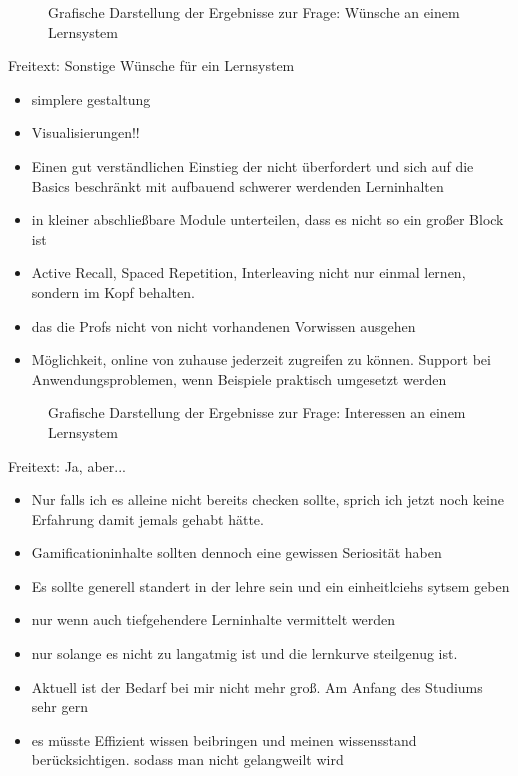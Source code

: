 \documentclass[
	ngerman,
	BCOR=8mm,
	headings=normal,
	parskip=half,
	headsepline,
	automark,
	listof=totoc,
	bibliography=totoc,
]{scrreprt}
\begin{document}
\begin{figure}[h!]
    \centering
    
    \caption{Grafische Darstellung der Ergebnisse zur Frage: Wünsche an einem Lernsystem}
\end{figure}

Freitext: Sonstige Wünsche für ein Lernsystem
\begin{itemize}
    \setlength{\itemsep}{-1pt} 
    \item simplere gestaltung
    \item Visualisierungen!!
    \item Einen gut verständlichen Einstieg der nicht überfordert und sich auf die Basics beschränkt mit aufbauend schwerer werdenden Lerninhalten
    \item in kleiner abschließbare Module unterteilen, dass es nicht so ein großer Block ist
    \item Active Recall, Spaced Repetition, Interleaving nicht nur einmal lernen, sondern im Kopf behalten.
    \item das die Profs nicht von nicht vorhandenen Vorwissen ausgehen
    \item Möglichkeit, online von zuhause jederzeit zugreifen zu können. Support bei Anwendungsproblemen, wenn Beispiele praktisch umgesetzt werden
\end{itemize}

\begin{figure}[h!]
    \centering
    
    \caption{Grafische Darstellung der Ergebnisse zur Frage: Interessen an einem Lernsystem}
\end{figure}

Freitext: Ja, aber...
\begin{itemize}
    \setlength{\itemsep}{-1pt} 
    \item Nur falls ich es alleine nicht bereits checken sollte, sprich ich jetzt noch keine Erfahrung damit jemals gehabt hätte.
    \item Gamificationinhalte sollten dennoch eine gewissen Seriosität haben
    \item Es sollte generell standert in der lehre sein und ein einheitlciehs sytsem geben
    \item nur wenn auch tiefgehendere Lerninhalte vermittelt werden
    \item nur solange es nicht zu langatmig ist und die lernkurve steilgenug ist.
    \item Aktuell ist der Bedarf bei mir nicht mehr groß. Am Anfang des Studiums sehr gern
    \item es müsste Effizient wissen beibringen und meinen wissensstand berücksichtigen. sodass man nicht gelangweilt wird
\end{itemize}
\end{document}
